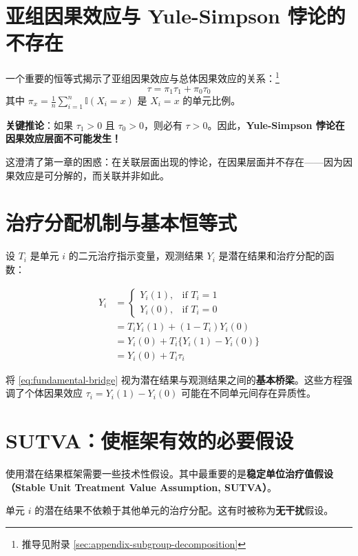 \section{亚组因果效应与 Yule-Simpson 悖论的不存在}

一个重要的恒等式揭示了亚组因果效应与总体因果效应的关系：\footnote{推导见附录 \cref{sec:appendix-subgroup-decomposition}}
\[
\tau = \pi_1 \tau_1 + \pi_0 \tau_0
\tag{2.5}\label{eq:ace-subgroup-decomposition}
\]
其中 $\pi_x = \frac{1}{n} \sum_{i=1}^n \mathbb{I}(X_i = x)$ 是 $X_i = x$ 的单元比例。

\textbf{关键推论}：如果 $\tau_1 > 0$ 且 $\tau_0 > 0$，则必有 $\tau > 0$。因此，\textbf{Yule-Simpson 悖论在因果效应层面不可能发生！}

这澄清了第一章的困惑：在关联层面出现的悖论，在因果层面并不存在——因为因果效应是可分解的，而关联并非如此。

\section{治疗分配机制与基本恒等式}

设 $T_i$ 是单元 $i$ 的二元治疗指示变量，观测结果 $Y_i$ 是潜在结果和治疗分配的函数：

\begin{align}
Y_i &= \begin{cases}
Y_i(1), & \text{if } T_i = 1 \\
Y_i(0), & \text{if } T_i = 0
\end{cases} \label{eq:observed-y} \\
&= T_i Y_i(1) + (1 - T_i) Y_i(0) \label{eq:fundamental-bridge} \\
&= Y_i(0) + T_i \{ Y_i(1) - Y_i(0) \} \label{eq:treatment-effect} \\
&= Y_i(0) + T_i \tau_i \label{eq:treatment-effect-2}
\end{align}

\cite{pearl2010} 将 \cref{eq:fundamental-bridge} 视为潜在结果与观测结果之间的\textbf{基本桥梁}。这些方程强调了个体因果效应 $\tau_i = Y_i(1) - Y_i(0)$ 可能在不同单元间存在异质性。

\section{SUTVA：使框架有效的必要假设}

使用潜在结果框架需要一些技术性假设。其中最重要的是\textbf{稳定单位治疗值假设（Stable Unit Treatment Value Assumption, SUTVA）}。

\begin{Assumption}[无干扰]\label{assump:sutva1}
单元 $i$ 的潜在结果不依赖于其他单元的治疗分配。这有时被称为\textbf{无干扰}假设。
\end{Assumption}

